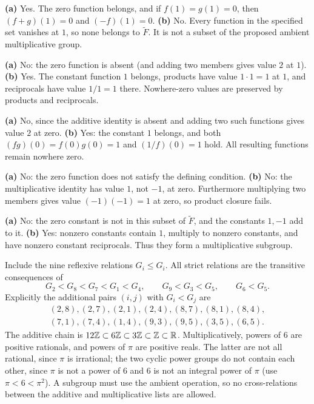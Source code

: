 
\textbf{(a)} Yes. The zero function belongs, and if $f(1)=g(1)=0$, then $(f+g)(1)=0$ and $(-f)(1)=0$. \textbf{(b)} No. Every function in the specified set vanishes at $1$, so none belongs to $\widetilde F$. It is not a subset of the proposed ambient multiplicative group.


\textbf{(a)} No: the zero function is absent (and adding two members gives value $2$ at $1$). \textbf{(b)} Yes. The constant function $1$ belongs, products have value $1\cdot1=1$ at $1$, and reciprocals have value $1/1=1$ there. Nowhere-zero values are preserved by products and reciprocals.


\textbf{(a)} No, since the additive identity is absent and adding two such functions gives value $2$ at zero. \textbf{(b)} Yes: the constant $1$ belongs, and both $(fg)(0)=f(0)g(0)=1$ and $(1/f)(0)=1$ hold. All resulting functions remain nowhere zero.


\textbf{(a)} No: the zero function does not satisfy the defining condition. \textbf{(b)} No: the multiplicative identity has value $1$, not $-1$, at zero. Furthermore multiplying two members gives value $(-1)(-1)=1$ at zero, so product closure fails.


\textbf{(a)} No: the zero constant is not in this subset of $\widetilde F$, and the constants $1,-1$ add to it. \textbf{(b)} Yes: nonzero constants contain $1$, multiply to nonzero constants, and have nonzero constant reciprocals. Thus they form a multiplicative subgroup.


Include the nine reflexive relations $G_i\le G_i$. All strict relations are the transitive consequences of
\[G_2<G_8<G_7<G_1<G_4,\qquad G_9<G_3<G_5,\qquad G_6<G_5.
\]
Explicitly the additional pairs $(i,j)$ with $G_i<G_j$ are
\[\begin{gathered}(2,8),(2,7),(2,1),(2,4),(8,7),(8,1),(8,4),\\(7,1),(7,4),(1,4),(9,3),(9,5),(3,5),(6,5).
\end{gathered}\]
The additive chain is $12\mathbb{Z}\subset6\mathbb{Z}\subset3\mathbb{Z}\subset\mathbb{Z}\subset\mathbb{R}$. Multiplicatively, powers of $6$ are positive rationals, and powers of $\pi$ are positive reals. The latter are not all rational, since $\pi$ is irrational; the two cyclic power groups do not contain each other, since $\pi$ is not a power of $6$ and $6$ is not an integral power of $\pi$ (use $\pi<6<\pi^2$). A subgroup must use the ambient operation, so no cross-relations between the additive and multiplicative lists are allowed.

